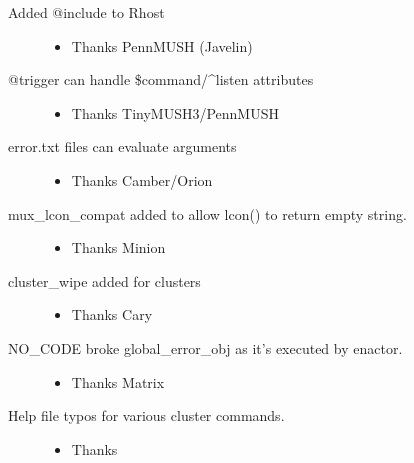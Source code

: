 \documentclass[letterpaper,10pt,english]{sphinxmanual}
\begin{document}
\begin{description}
\begin{itemize}
\end{itemize}

\item[{Added @include to Rhost}] \leavevmode\begin{itemize}
\item {} 
\sphinxAtStartPar
Thanks PennMUSH (Javelin)

\end{itemize}

\item[{@trigger can handle \$command/\textasciicircum{}listen attributes}] \leavevmode\begin{itemize}
\item {} 
\sphinxAtStartPar
Thanks TinyMUSH3/PennMUSH

\end{itemize}

\item[{error.txt files can evaluate arguments}] \leavevmode\begin{itemize}
\item {} 
\sphinxAtStartPar
Thanks Camber/Orion

\end{itemize}

\item[{mux\_lcon\_compat added to allow lcon() to return empty string.}] \leavevmode\begin{itemize}
\item {} 
\sphinxAtStartPar
Thanks Minion

\end{itemize}

\item[{cluster\_wipe added for clusters}] \leavevmode\begin{itemize}
\item {} 
\sphinxAtStartPar
Thanks Cary

\end{itemize}

\item[{NO\_CODE broke global\_error\_obj as it’s executed by enactor.}] \leavevmode\begin{itemize}
\item {} 
\sphinxAtStartPar
Thanks Matrix

\end{itemize}

\item[{Help file typos for various cluster commands.}] \leavevmode\begin{itemize}
\item {} 
\sphinxAtStartPar
Thanks 

\end{itemize}

\end{description}
\end{document}
